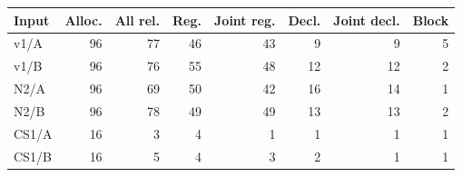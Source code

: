 \begin{tabular}{lrrrrrrr}
\toprule
Input & Alloc. & All rel. & Reg. & Joint reg. & Decl. & Joint decl. & Block \\
\midrule
v1/A & 96 & 77 & 46 & 43 & 9 & 9 & 5 \\
v1/B & 96 & 76 & 55 & 48 & 12 & 12 & 2 \\
N2/A & 96 & 69 & 50 & 42 & 16 & 14 & 1 \\
N2/B & 96 & 78 & 49 & 49 & 13 & 13 & 2 \\
CS1/A & 16 & 3 & 4 & 1 & 1 & 1 & 1 \\
CS1/B & 16 & 5 & 4 & 3 & 2 & 1 & 1 \\
\bottomrule
\end{tabular}
